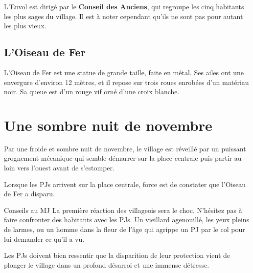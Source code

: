\documentclass[a4paper,10pt,twoside,twocolumn,openany,bg=print,justified]{dndarticle}
\begin{document}
L'Envol est dirigé par le \textbf{Conseil des Anciens}, qui regroupe les cinq habitants les plus sages du village. Il est à noter cependant qu'ils ne sont pas pour autant les plus vieux.

\subsection{L'Oiseau de Fer}

L'Oiseau de Fer est une statue de grande taille, faite en métal. Ses ailes ont une envergure d'environ 12 mètres, et il repose sur trois roues enrobées d'un matériau noir. Sa queue est d'un rouge vif orné d'une croix blanche.

\section{Une sombre nuit de novembre}

Par une froide et sombre nuit de novembre, le village est réveillé par un puissant grognement mécanique qui semble démarrer sur la place centrale puis partir au loin vers l'ouest avant de s'estomper.

Lorsque les PJs arrivent sur la place centrale, force est de constater que l'Oiseau de Fer a disparu.

\begin{paperbox}{Conseils au MJ}
La première réaction des villageois sera le choc. N'hésitez pas à faire confronter des habitants avec les PJs. Un vieillard agenouillé, les yeux pleins de larmes, ou un homme dans la fleur de l'âge qui agrippe un PJ par le col pour lui demander ce qu'il a vu.

Les PJs doivent bien ressentir que la disparition de leur protection vient de plonger le village dans un profond désarroi et une immense détresse.
\end{paperbox}
\end{document}
